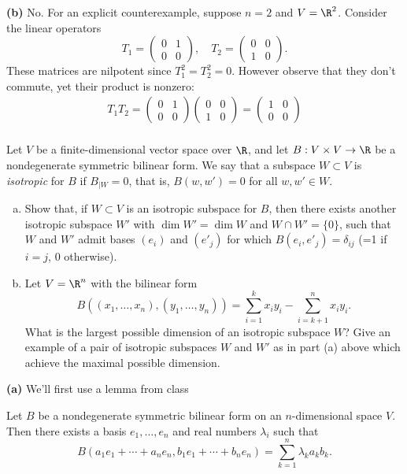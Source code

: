 \documentclass[11pt, letterpaper]{article}
\begin{document}
\textbf{(b)} No. For an explicit counterexample, suppose $n=2$ and $V=\R^2$. Consider the linear operators
\[
    T_1=\begin{pmatrix} 0&1\\0&0 \end{pmatrix}, \quad T_2=\begin{pmatrix} 0&0\\1&0 \end{pmatrix}
.\] 
These matrices are nilpotent since $T_1^2=T_2^2=0$. However observe that they don't commute, yet their product is nonzero:
\[
    \begin{aligned}
        T_1T_2=\begin{pmatrix}0&1\\0&0\end{pmatrix}\begin{pmatrix}0&0\\1&0\end{pmatrix}=\begin{pmatrix}1&0\\0&0\end{pmatrix}\\
    \end{aligned}
\] 

\pagebreak
\begin{problem}[9 points]
    Let $V$ be a finite-dimensional vector space over $\R$, and let $B:V\times V\to \R$ be a nondegenerate symmetric bilinear form.  We say that a subspace $W\subset V$ is {\em isotropic} for $B$ if $B_{|W}=0$, that is, $B(w,w')=0$ for all $w,w'\in W$.
    \begin{enumerate}[(a)]
        \item Show that, if $W\subset V$ is an isotropic subspace for $B$, then there exists another isotropic subspace $W'$ with $\dim W'=\dim W$ and $W\cap W'=\{0\}$, such that $W$ and $W'$ admit bases $(e_i)$ and $(e'_j)$ for which $B(e_i,e'_j)=\delta_{ij}$ (=1 if $i=j$, 0 otherwise).
        \item Let $V=\R^n$ with the bilinear form \[B((x_1,\dots,x_n),(y_1,\dots,y_n))=\sum_{i=1}^k x_iy_i-\sum_{i=k+1}^n x_iy_i.\] What is the largest possible dimension of an isotropic subspace $W$? Give an example of a pair of isotropic subspaces $W$ and $W'$ as in part (a) above which achieve the maximal possible dimension. 
    \end{enumerate}
\end{problem}

\textbf{(a)} We'll first use a lemma from class
\begin{lemma}
     Let $B$ be a nondegenerate symmetric bilinear form on an $n$-dimensional space $V$. Then there exists a basis $e_1,\ldots, e_n$ and real numbers $\lambda_i$ such that 
     \[
         B(a_1e_1+\cdots+a_ne_n, b_1e_1+\cdots+b_ne_n) = \sum^n_{k=1} \lambda_k a_k b_k
     .\] 
\end{lemma}
\end{document}

